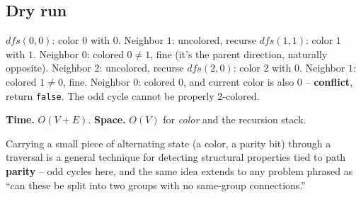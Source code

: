 \subsection*{Dry run}


$\textit{dfs}(0,0)$: color $0$ with $0$. Neighbor $1$: uncolored,
recurse $\textit{dfs}(1,1)$: color $1$ with $1$. Neighbor $0$: colored
$0 \neq 1$, fine (it's the parent direction, naturally opposite).
Neighbor $2$: uncolored, recurse $\textit{dfs}(2,0)$: color $2$ with
$0$. Neighbor $1$: colored $1 \neq 0$, fine. Neighbor $0$: colored
$0$, and current color is also $0$ -- \textbf{conflict}, return
\texttt{false}. The odd cycle cannot be properly $2$-colored.

\begin{complexitybox}
\textbf{Time.} $O(V+E)$.
\textbf{Space.} $O(V)$ for \textit{color} and the recursion stack.
\end{complexitybox}

\begin{takeawaybox}
Carrying a small piece of alternating state (a color, a parity bit)
through a traversal is a general technique for detecting structural
properties tied to path \textbf{parity} -- odd cycles here, and the
same idea extends to any problem phrased as ``can these be split into
two groups with no same-group connections.''
\end{takeawaybox}
